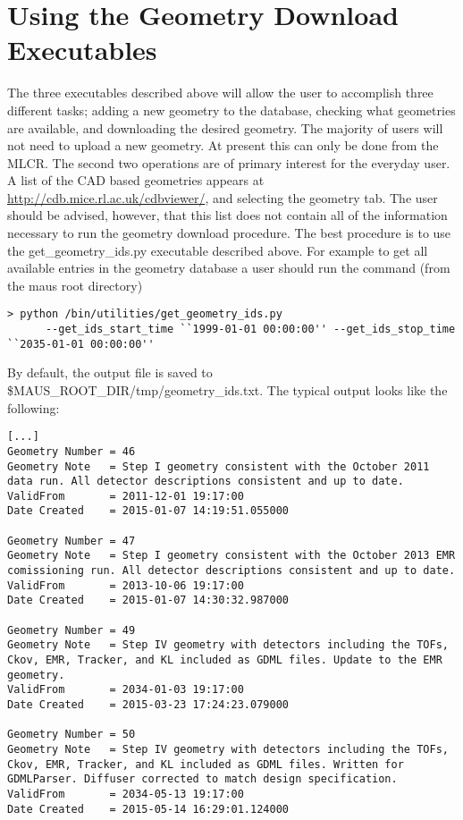 \section{Using the Geometry Download Executables}

The three executables described above will allow the user to
accomplish three different tasks; adding a new geometry to the
database, checking what geometries are available, and downloading the
desired geometry. The majority of users will not need to upload a new
geometry. At present this can only be done from the MLCR. The second
two operations are of primary interest for the everyday user. A list
of the CAD based geometries appears at
\url{http://cdb.mice.rl.ac.uk/cdbviewer/}, and selecting the geometry
tab. The user should be advised, however, that this list does not
contain all of the information necessary to run the geometry download
procedure. The best procedure is to use the get\_geometry\_ids.py
executable described above. For example to get all available entries
in the geometry database a user should run the command (from the maus
root directory)
\begin{verbatim}
> python /bin/utilities/get_geometry_ids.py 
      --get_ids_start_time ``1999-01-01 00:00:00'' --get_ids_stop_time ``2035-01-01 00:00:00''
\end{verbatim}
By default, the output file is saved to
\$MAUS\_ROOT\_DIR/tmp/geometry\_ids.txt. The typical output looks like
the following:
\begin{verbatim}
[...]
Geometry Number = 46
Geometry Note   = Step I geometry consistent with the October 2011 data run. All detector descriptions consistent and up to date.
ValidFrom       = 2011-12-01 19:17:00
Date Created    = 2015-01-07 14:19:51.055000

Geometry Number = 47
Geometry Note   = Step I geometry consistent with the October 2013 EMR comissioning run. All detector descriptions consistent and up to date.
ValidFrom       = 2013-10-06 19:17:00
Date Created    = 2015-01-07 14:30:32.987000

Geometry Number = 49
Geometry Note   = Step IV geometry with detectors including the TOFs, Ckov, EMR, Tracker, and KL included as GDML files. Update to the EMR geometry.
ValidFrom       = 2034-01-03 19:17:00
Date Created    = 2015-03-23 17:24:23.079000

Geometry Number = 50
Geometry Note   = Step IV geometry with detectors including the TOFs, Ckov, EMR, Tracker, and KL included as GDML files. Written for GDMLParser. Diffuser corrected to match design specification.
ValidFrom       = 2034-05-13 19:17:00
Date Created    = 2015-05-14 16:29:01.124000
\end{verbatim}

